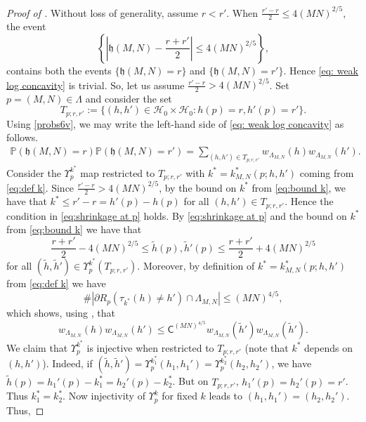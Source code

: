 \documentclass[reqno,11pt]{amsart}
\newcommand{\h}{\mathfrak{h}}
\numberwithin{equation}{section}
\theoremstyle{definition}
\begin{document}
\begin{proof}[Proof of ] Without loss of generality, assume $r<r'$.
    When $\frac{r'-r}{2} \le 4(MN)^{2/5}$, 
    the event
    \begin{equation*}
        \left\{\left| \h(M,N) - \frac{r+r'}{2} \right| \le 4(MN)^{2/5} \right\},
    \end{equation*}
     contains both the events $\{\h(M,N)=r \}$ and $\{\h(M,N)=r' \}$. Hence \eqref{eq: weak log concavity} is trivial. So, let us assume $\frac{r'-r}{2} >4(MN)^{2/5}$. Set $p=(M,N)\in \Lambda$ and consider the set
     $$T_{p;r,r'}:=\big\{ (h,h')\in \mathscr{H}_0^{}\times \mathscr{H}_0^{} : h(p)=r, h'(p)=r'\big\}.$$
     Using \eqref{probs6v}, we may write the left-hand side of \eqref{eq: weak log concavity} as follows.
     \begin{align}\label{eq:ltr}
         \mathbb{P}(\h(M,N)=r) \mathbb{P}(\h(M,N)=r')=\sum_{(h,h')\in T_{p;r,r'} } w_{\Lambda_{M,N}}(h) w_{\Lambda_{M,N}} (h'). 
     \end{align}
   Consider the $\Upsilon_{p}^{k^*}$ map restricted to $T_{p;r,r'}$ with $k^*=k_{M,N}^*(p;h,h')$ coming from \eqref{eq:def k}. Since $\frac{r'-r}{2} >4(MN)^{2/5}$, by the bound on $k^*$ from \eqref{eq:bound k}, we have that $k^* \le r'-r=h'(p)-h(p)$ for all $(h,h')\in T_{p;r,r'}$. Hence the condition in \eqref{eq:shrinkage at p} holds. By \eqref{eq:shrinkage at p} and the bound on $k^*$ from \eqref{eq:bound k} we have that
    \begin{equation}\label{eqbdf}
        \frac{r+r'}{2} - 4(MN)^{2/5} \le \widetilde{h}(p) , \widetilde{h}'(p) \le \frac{r+r'}{2} + 4(MN)^{2/5}
    \end{equation}
    for all $(\widetilde{h},\widetilde{h}') \in \Upsilon_{p}^{k^*}(T_{p;r,r'})$. Moreover, by definition of $k^*=k_{M,N}^*(p;h,h')$ from \eqref{eq:def k} we have
    \begin{equation*}
        \#\left| \partial R_{p}(\tau_{k^*}(h) \neq h') \cap \Lambda_{M,N} \right| \le (MN)^{4/5},
    \end{equation*}
    which shows, using , that
    \begin{equation} \label{eq:log concavity h htilde}
        w_{\Lambda_{M,N}}(h) w_{\Lambda_{M,N}} (h') \le  \mathsf{C}^{(MN)^{4/5}} w_{\Lambda_{M,N}} (\widetilde{h}') w_{\Lambda_{M,N}} (\widetilde{h}').
    \end{equation}
We claim that $\Upsilon_{p}^{k^*}$ is injective when restricted to $T_{p;r,r'}$ (note that $k^*$ depends on $(h,h')$).  Indeed, if $(\widetilde{h},\widetilde{h}')=\Upsilon_p^{k_1^*}(h_1,h_1')=\Upsilon_p^{k_2^*}(h_2,h_2')$, we have $\widetilde{h}(p)=h_1'(p)-k_1^*=h_2'(p)-k_2^*$. But on $T_{p;r,r'}$, $h_1'(p)=h_2'(p)=r'$. Thus $k_1^*=k_2^*$. Now injectivity of $\Upsilon_p^k$ for fixed $k$ leads to $(h_1,h_1')=(h_2,h_2')$.  Thus,

\end{proof}
\end{document}
